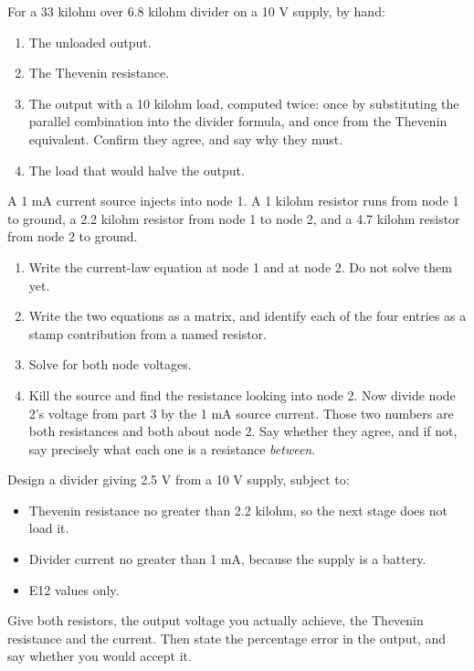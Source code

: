 \label{c1:ex:3}
For a 33 kilohm over 6.8 kilohm divider on a 10 V supply, by hand:

\begin{enumerate}
  \item The unloaded output.
  \item The Thevenin resistance.
  \item The output with a 10 kilohm load, computed twice: once by substituting the parallel combination into the divider formula, and once from the Thevenin equivalent. Confirm they agree, and say why they must.
  \item The load that would halve the output.
\end{enumerate}

\label{c1:ex:4}
A 1 mA current source injects into node 1. A 1 kilohm resistor runs from node 1 to ground, a 2.2 kilohm resistor from node 1 to node 2, and a 4.7 kilohm resistor from node 2 to ground.

\begin{enumerate}
  \item Write the current-law equation at node 1 and at node 2. Do not solve them yet.
  \item Write the two equations as a matrix, and identify each of the four entries as a stamp contribution from a named resistor.
  \item Solve for both node voltages.
  \item Kill the source and find the resistance looking into node 2. Now divide node 2's voltage from part 3 by the 1 mA source current. Those two numbers are both resistances and both about node 2. Say whether they agree, and if not, say precisely what each one is a resistance \emph{between}.
\end{enumerate}

\label{c1:ex:5}
Design a divider giving 2.5 V from a 10 V supply, subject to:

\begin{itemize}
  \item Thevenin resistance no greater than 2.2 kilohm, so the next stage does not load it.
  \item Divider current no greater than 1 mA, because the supply is a battery.
  \item E12 values only.
\end{itemize}
Give both resistors, the output voltage you actually achieve, the Thevenin resistance and the current. Then state the percentage error in the output, and say whether you would accept it.

